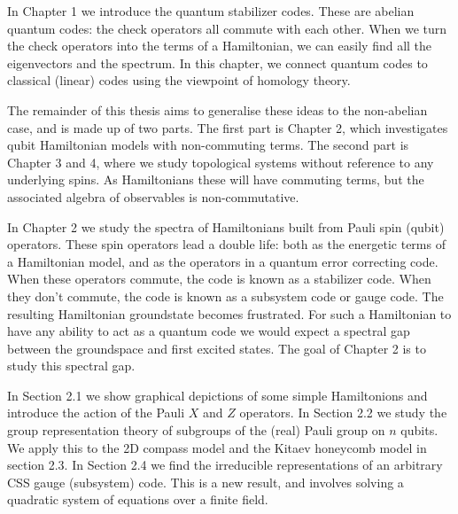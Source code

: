 \documentclass[11pt,oneside]{report}
\begin{document}
In Chapter 1 we introduce 
the quantum stabilizer codes.
These are abelian quantum codes: the check operators
all commute with each other.
When we turn the check operators into the terms of a
Hamiltonian, we can easily find all the eigenvectors and the spectrum.
In this chapter, we connect quantum codes to classical
(linear) codes using the viewpoint of homology theory. 

The remainder of this thesis aims to generalise these
ideas to the non-abelian case, 
and is made up of two parts.
The first part is Chapter 2, which investigates
qubit Hamiltonian models with non-commuting terms.
The second part is Chapter 3 and 4, where we study
topological systems without reference to any underlying spins.
As Hamiltonians these will have
commuting terms, but the associated algebra of observables
is non-commutative.

In Chapter 2 we study the spectra of 
Hamiltonians built from Pauli spin (qubit) operators.
These spin operators lead a double life:
both as the energetic terms of a Hamiltonian model, and as
the operators in a quantum error correcting code.
When these operators commute, the code is known as a stabilizer code.
When they don't commute, the code is known as a subsystem code or gauge code.
The resulting Hamiltonian groundstate becomes frustrated.
For such a Hamiltonian to have any ability to act as a quantum
code we would expect a spectral gap between the
groundspace and first excited states.
The goal of Chapter 2 is to study this spectral gap.

In Section 2.1 we show graphical depictions of
some simple Hamiltonions and introduce the action of
the Pauli $X$ and $Z$ operators.
In Section 2.2 we study the group representation theory
of subgroups of the (real) Pauli group on $n$ qubits.
We apply this to the 2D compass model and the
Kitaev honeycomb model in section 2.3. 
In Section 2.4 we find the 
irreducible representations of an arbitrary CSS gauge (subsystem) code.
This is a new result, and involves solving a quadratic 
system of equations over a finite field.
\end{document}
